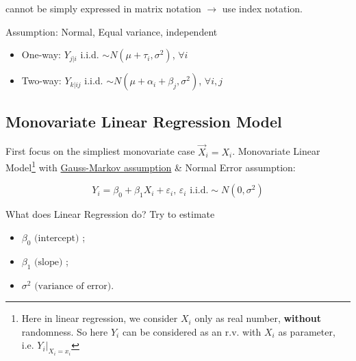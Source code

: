     cannot be simply expressed in matrix notation $ \longrightarrow $ use index notation.

    Assumption: Normal, Equal variance, independent
\begin{itemize}[topsep=2pt,itemsep=0pt]
    \item One-way: $ Y_{j|i} $ i.i.d. $ \sim N(\mu+\tau_i,\sigma ^2) $, $ \forall i $
    \item Two-way: $ Y_{k|ij} $ i.i.d. $ \sim N(\mu +\alpha _i+\beta _j,\sigma ^2) $, $ \forall i,j $
\end{itemize}

    
    
    


























\subsection{Monovariate Linear Regression Model}
    First focus on the simpliest monovariate case $ \vec{X}_i=X_i $. Monovariate Linear Model\footnote{Here in linear regression, we consider $ X_i $ only as real number, \textbf{without} randomness. So here $ Y_i $ can be considered as an r.v. with $ X_i $ as parameter, i.e. $ Y_i|_{X_i=x_i} $}
    with \hyperlink{GaussMarkovAssumption}{Gauss-Markov assumption} \& Normal Error assumption:
    
    \begin{equation}
        Y_i=\beta _0+\beta _1X_i+\varepsilon _i ,\, \varepsilon _i\text{ i.i.d.}\sim N(0,\sigma ^2) 
    \end{equation}


 
  


    What does Linear Regression do? Try to estimate 
    \begin{itemize}[topsep=0pt,itemsep=-2pt]
        \item $ \beta _0\text{ (intercept) }$;
        \item $\beta _1\text{ (slope) }$;
        \item $\sigma ^2\text{ (variance of error)} $.
    \end{itemize}
    
